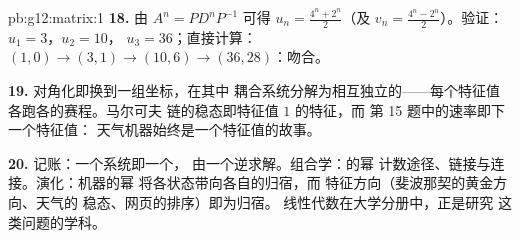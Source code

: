 \begin{solution}{pb:g12:matrix:1}
\textbf{18.} 由 $A^n = P D^n P^{-1}$ 可得
$u_n = \frac{4^n + 2^n}{2}$（及
$v_n = \frac{4^n - 2^n}{2}$）。验证：$u_1 = 3$，$u_2 = 10$，
$u_3 = 36$；直接计算：$(1,0) \to (3,1) \to (10,6) \to
(36, 28)$：吻合。

\textbf{19.} 对角化即换到一组坐标，在其中
耦合系统分解为相互独立的——每个特征值各跑各的赛程。马尔可夫
链的稳态即特征值 $1$ 的特征，而
第 15 题中的速率即下一个特征值：
天气机器始终是一个特征值的故事。

\textbf{20.} 记账：一个系统即一个，
由一个逆求解。组合学：的幂
计数途径、链接与连接。演化：机器的幂
将各状态带向各自的归宿，而
特征方向（斐波那契的黄金方向、天气的
稳态、网页的排序）即为归宿。
线性代数在大学分册中，正是研究
这类问题的学科。
\end{solution}
